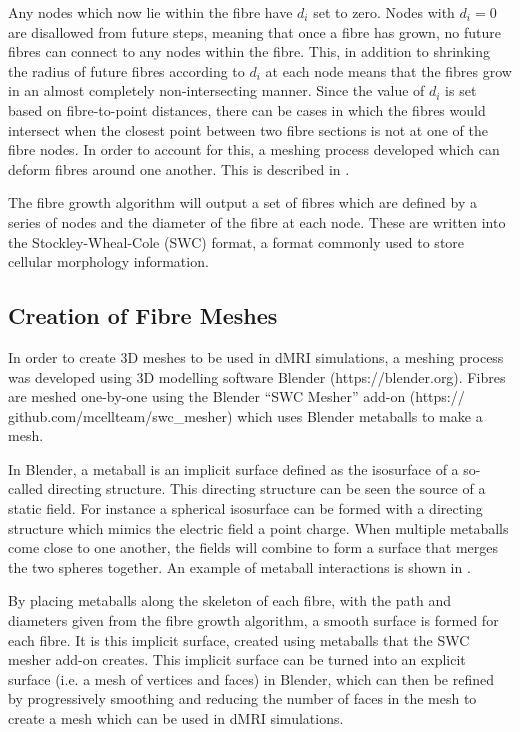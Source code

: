 Any nodes which now lie within the fibre have $d_i$ set to zero.
Nodes with $d_i = 0$ are disallowed from future steps, meaning that once a fibre has grown, no future fibres can connect to any nodes within the fibre.
This, in addition to shrinking the radius of future fibres according to $d_i$ at each node means that the fibres grow in an almost completely  non-intersecting manner.
Since the value of $d_i$ is set based on fibre-to-point distances, there can be cases in which the fibres would intersect when the closest point between two fibre sections is not at one of the fibre nodes.
In order to account for this, a meshing process developed which can deform fibres around one another. This is described in .


The fibre growth algorithm will output a set of fibres which are defined by a series of nodes and the diameter of the fibre at each node.
These are written into the Stockley-Wheal-Cole (SWC) format\cite{Stockley1993}, a format commonly used to store cellular morphology information.
\vspace{-1em}
\subsection{Creation of Fibre Meshes}
\label{sec:creation_of_fibre_meshses}
In order to create 3D meshes to be used in dMRI simulations, a meshing process was developed using 3D modelling software Blender (https://blender.org).
Fibres are meshed one-by-one using the Blender “SWC Mesher” add-on  (https://\\github.com/mcellteam/swc\_mesher) which uses Blender metaballs to make a mesh.

In Blender, a metaball is an implicit surface defined as the isosurface of a so-called directing structure.
This directing structure can be seen the source of a static field. For instance a spherical isosurface can be formed with a directing structure which mimics the electric field a point charge.
When multiple metaballs come close to one another, the fields will combine to form a surface that merges the two spheres together.
An example of metaball interactions is shown in .

By placing metaballs along the skeleton of each fibre, with the path and diameters given from the fibre growth algorithm, a smooth surface is formed for each fibre.
It is this implicit surface, created using metaballs that the SWC mesher add-on creates.
This implicit surface can be turned into an explicit surface (i.e. a mesh of vertices and faces) in Blender, which can then be refined by progressively smoothing and reducing the number of faces in the mesh to create a mesh which can be used in dMRI simulations.

